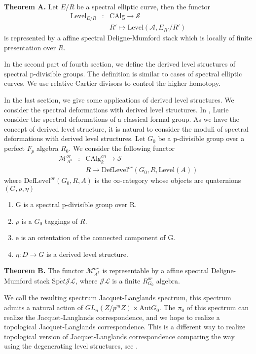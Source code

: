 \documentclass[12pt]{article}
\theoremstyle{thry}
\def  \Aut      {\mathrm{Aut}}
\def  \CAlg     {\mathrm{CAlg}}
\def  \Level    {\mathrm{Level}}
\def  \Spet     {\mathrm{Sp}\acute{e}t}
\def  \ca       {\mathcal{A}}
\def  \cj       {\mathcal{J}}
\def  \cl       {\mathcal{L}}
\def  \cm       {\mathcal{M}}
\def  \cs       {\mathcal{S}}
\begin{document}
\textbf{Theorem A.}	Let $E/R$ be a spectral elliptic curve, then the functor
	\begin{eqnarray*}
		\Level_{E/R} & :& \CAlg \to \cs  \\
		&  &	R' \mapsto \Level(\ca , E_{R'}/R')
	\end{eqnarray*}
	is represented by a affine spectral Deligne-Mumford stack which is locally of finite presentation over $R$. 



In the second part of fourth section, we define the derived level structures of spectral p-divisible groups. The definition is similar to cases of spectral elliptic curves. We use relative Cartier divisors to control the higher homotopy.

In the last section, we give some applications of derived level structures. We consider the spectral deformations with derived level structures.  In \cite{lu-EC2}, Lurie consider the spectral  deformations of a classical  formal group. As we have the concept of derived level structure, it is natural to consider the moduli of spectral deformations with derived level structures. 
Let $G_0$ be a  p-divisible group over a  perfect $F_p$ algebra $R_0$. We consider the following functor
\begin{eqnarray*}
	\cm^{or}_{A^k} &: &\CAlg^{cn}_k \to \cs  \\
	&  & R \to  \mathrm{DefLevel}^{or}(G_0,R, \Level(A))
\end{eqnarray*}
where $\mathrm{DefLevel}^{or}(G_0,R, A)$ is  the $\infty$-category whose objects are quaternions $(G, \rho, \eta)$
\begin{enumerate}
	\item G is a  spectral p-divisible group over R.
	\item $\rho$ is a $G_0$ taggings of $R$.
	\item e is an orientation of the connected component of G.
	\item $\eta:  D\to G$ is a derived level structure.
	
\end{enumerate}


\textbf{Theorem B.} The functor $\cm^{or}_{A^k}$ is representable by a affine spectral Deligne-Mumford stack $\Spet \cj \cl$, where $\mathcal{JL}$ is a finite $R^{or}_{G_0}$ algebra.



We call the resulting  spectrum Jacquet-Langlands spectrum, this spectrum admits a natural action of $GL_n(Z/p^m Z) \times \Aut G_0$.  The $\pi_0$ of this spectrum can realize the  Jacquet-Langlands correspondence,  and we hope to realize a topological Jacquet-Langlands correspondence.  This is a different way to realize  topological version of Jacquet-Langlands correspondence comparing the way using the degenerating level structures, see \cite{Salch2023elladicTJ}.
\end{document}

